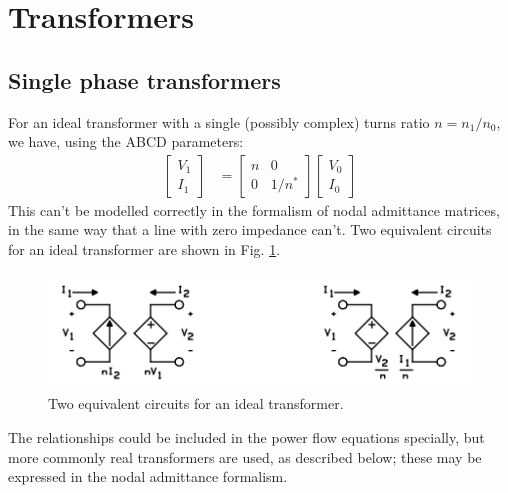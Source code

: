 \documentclass[10pt]{article}
\begin{document}
\section{Transformers}
\subsection{Single phase transformers}
For an ideal transformer with a single (possibly complex) turns ratio $n = n_1/n_0$, we have, using the ABCD parameters:
\begin{align}
\begin{bmatrix}V_1 \\ I_1\end{bmatrix} &= \begin{bmatrix}n & 0 \\ 0 & 1/n^*\end{bmatrix}\begin{bmatrix}V_0 \\ I_0 \end{bmatrix}
\end{align}
This can't be modelled correctly in the formalism of nodal admittance matrices, in the same way that a line with zero impedance can't. Two equivalent circuits for an ideal transformer are shown in Fig. \ref{FIG_IDEAL_TRANS_EQUIV}.
\begin{figure}[!h]
	\begin{center}
		\includegraphics[width=(\textwidth-2cm)]{ideal_transformer_equiv.png}
	\end{center}
	\caption{
		Two equivalent circuits for an ideal transformer.
	}
	\label{FIG_IDEAL_TRANS_EQUIV}
\end{figure}
The relationships could be included in the power flow equations specially, but more commonly real transformers are used, as described below; these may be expressed in the nodal admittance formalism.
\end{document}
